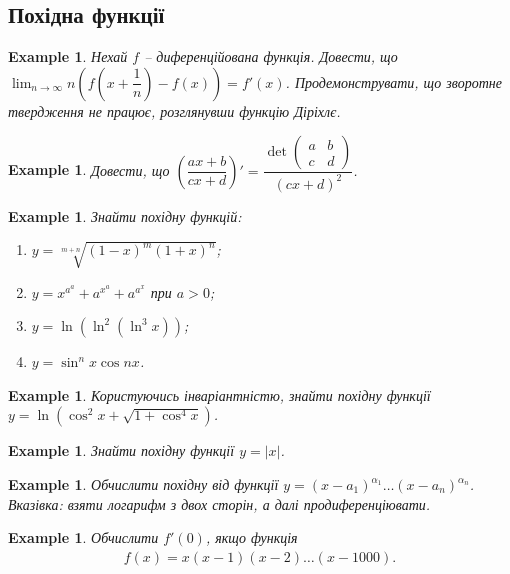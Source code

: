 \documentclass[a4paper, 14pt]{article}
\theoremstyle{theoremdd}
\theoremstyle{theoremdd}
\theoremstyle{theoremdd}
\theoremstyle{theoremdd}
\newtheorem{example}[theorem]{Example}
\theoremstyle{theoremdd}
\theoremstyle{theoremdd}
\theoremstyle{theoremdd}
\theoremstyle{theoremdd}
\theoremstyle{theoremdd}
\begin{document}
\subsection{Похідна функції}
\begin{example}
Нехай $f$ -- диференційована функція. Довести, що $\displaystyle\lim_{n \to \infty} n \left( f\left( x + \dfrac{1}{n}\right) - f(x) \right) = f'(x)$. Продемонструвати, що зворотне твердження не працює, розглянувши функцію Діріхлє. 
\end{example}

\begin{example}
Довести, що $\left( \dfrac{ax+b}{cx+d}\right)' = \dfrac{\det \begin{pmatrix}
a & b \\
c & d
\end{pmatrix} }{(cx+d)^2}$.
\end{example}

\begin{example}
Знайти похідну функцій:
\begin{enumerate}[nosep,wide=0pt,label={\arabic*)}]
\item $y = \sqrt[m+n]{(1-x)^m(1+x)^n}$;
\item $y = x^{a^a} + a^{x^a} + a^{a^x}$ при $a > 0$;
\item $y = \ln (\ln^2 (\ln^3 x))$;
\item $y = \sin^n x \cos nx$.
\end{enumerate}
\end{example}

\begin{example}
Користуючись інваріантністю, знайти похідну функції $y = \ln (\cos^2 x + \sqrt{1+\cos^4 x})$.
\end{example}

\begin{example}
Знайти похідну функції $y = |x|$.
\end{example}

\begin{example}
Обчислити похідну від функції $y = (x-a_1)^{\alpha_1} \dots (x-a_n)^{\alpha_n}$.\\
\textit{Вказівка: взяти логарифм з двох сторін, а далі продиференціювати.}
\end{example}

\begin{example}
Обчислити $f'(0)$, якщо функція
\begin{align*}
f(x) = x(x-1)(x-2)\dots (x-1000).
\end{align*}
\end{example}
\end{document}

